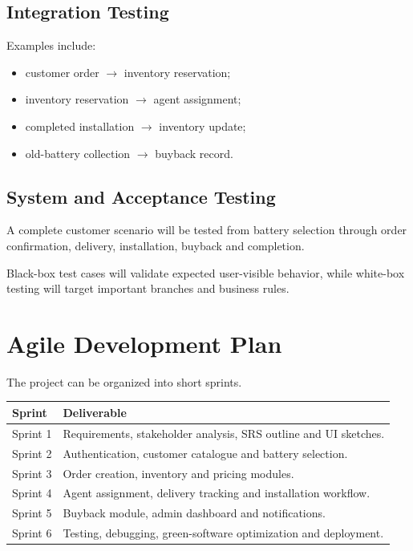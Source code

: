 \documentclass[11pt,a4paper]{article}
\begin{document}
\subsection{Integration Testing}

Examples include:

\begin{itemize}[leftmargin=0.7cm]
    \item customer order $\rightarrow$ inventory reservation;
    \item inventory reservation $\rightarrow$ agent assignment;
    \item completed installation $\rightarrow$ inventory update;
    \item old-battery collection $\rightarrow$ buyback record.
\end{itemize}

\subsection{System and Acceptance Testing}

A complete customer scenario will be tested from battery selection through
order confirmation, delivery, installation, buyback and completion.

Black-box test cases will validate expected user-visible behavior, while
white-box testing will target important branches and business rules.

\section{Agile Development Plan}

The project can be organized into short sprints.

\begin{center}
\begin{tabularx}{\textwidth}{p{}X}
\toprule
\textbf{Sprint} & \textbf{Deliverable} \\
\midrule
Sprint 1 & Requirements, stakeholder analysis, SRS outline and UI sketches. \\
Sprint 2 & Authentication, customer catalogue and battery selection. \\
Sprint 3 & Order creation, inventory and pricing modules. \\
Sprint 4 & Agent assignment, delivery tracking and installation workflow. \\
Sprint 5 & Buyback module, admin dashboard and notifications. \\
Sprint 6 & Testing, debugging, green-software optimization and deployment. \\
\bottomrule
\end{tabularx}
\end{center}
\end{document}
